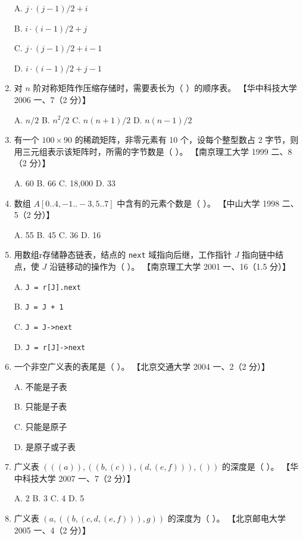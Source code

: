 \documentclass[lang=cn,newtx,10pt,scheme=chinese]{elegantbook}
\begin{document}
\begin{enumerate}
    A. $j \cdot (j-1)/2 + i$  

    B. $i \cdot (i-1)/2 + j$  

    C. $j \cdot (j-1)/2 + i - 1$  

    D. $i \cdot (i-1)/2 + j - 1$  

    \item 对 $n$ 阶对称矩阵作压缩存储时，需要表长为（ ）的顺序表。  
    【华中科技大学 2006 一、7（2 分）】  

    A. $n/2$ \quad B. $n^2/2$ \quad C. $n(n+1)/2$ \quad D. $n(n-1)/2$  

    \item 有一个 $100 \times 90$ 的稀疏矩阵，非零元素有 10 个，设每个整型数占 2 字节，则用三元组表示该矩阵时，所需的字节数是（ ）。  
    【南京理工大学 1999 二、8（2 分）】  

    A. 60 \quad B. 66 \quad C. 18,000 \quad D. 33 

    \item 数组 $A[0..4, -1..-3, 5..7]$ 中含有的元素个数是（ ）。  
    【中山大学 1998 二、5（2 分）】  

    A. 55 \quad B. 45 \quad C. 36 \quad D. 16  

    \item 用数组r存储静态链表，结点的 \texttt{next} 域指向后继，工作指针 $J$ 指向链中结点，使 $J$ 沿链移动的操作为（ ）。  
    【南京理工大学 2001 一、16（1.5 分）】  

    A. \texttt{J = r[J].next}  

    B. \texttt{J = J + 1}  

    C. \texttt{J = J->next}  

    D. \texttt{J = r[J]->next}  

    \item 一个非空广义表的表尾是（ ）。  
    【北京交通大学 2004 一、2（2 分）】  

    A. 不能是子表  

    B. 只能是子表  

    C. 只能是原子  

    D. 是原子或子表  

    \item 广义表 $(((a)), ((b, (c)), (d, (e, f))), ())$ 的深度是（ ）。  
    【华中科技大学 2007 一、7（2 分）】  

    A. 2 \quad B. 3 \quad C. 4 \quad D. 5  

    \item 广义表 $(a, ((b, (c, d, (e, f))), g))$ 的深度为（ ）。  
    【北京邮电大学 2005 一、4（2 分）】  


\end{enumerate}
\end{document}
